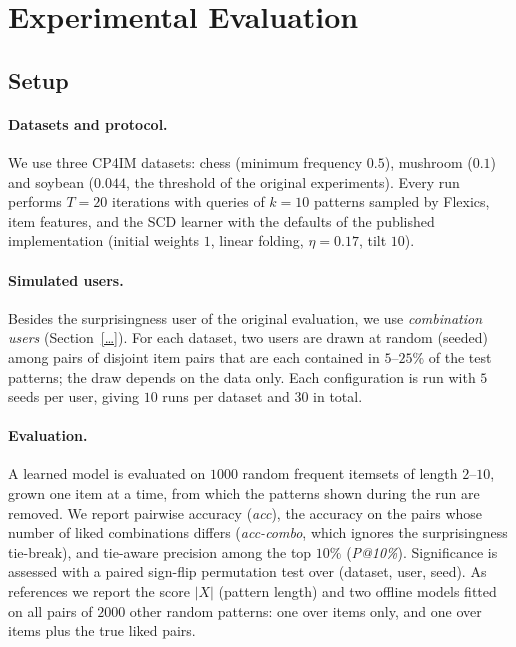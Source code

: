 
\section{Experimental Evaluation}
\label{sec:experiments}

\subsection{Setup}
\label{subsec:setup}

\paragraph{Datasets and protocol.}
We use three CP4IM datasets: chess (minimum frequency $0.5$), mushroom ($0.1$) and soybean ($0.044$, the
threshold of the original experiments). Every run performs $T = 20$ iterations with queries of $k = 10$
patterns sampled by Flexics, item features, and the SCD learner with the defaults of the published
implementation (initial weights $1$, linear folding, $\eta = 0.17$, tilt $10$).

\paragraph{Simulated users.}
Besides the surprisingness user of the original evaluation, we use \emph{combination users}
(Section~\ref{…}). For each dataset, two users are drawn at random (seeded) among pairs of disjoint item pairs
that are each contained in $5$--$25\%$ of the test patterns; the draw depends on the data only. Each
configuration is run with $5$ seeds per user, giving $10$ runs per dataset and $30$ in total.

\paragraph{Evaluation.}
A learned model is evaluated on $1000$ random frequent itemsets of length $2$--$10$, grown one item at a
time, from which the patterns shown during the run are removed. We report pairwise accuracy (\emph{acc}),
the accuracy on the pairs whose number of liked combinations differs (\emph{acc-combo}, which ignores the
surprisingness tie-break), and tie-aware precision among the top $10\%$ (\emph{P@10\%}). Significance is
assessed with a paired sign-flip permutation test over (dataset, user, seed). As references we report the
score $|X|$ (pattern length) and two offline models fitted on all pairs of $2000$ other random patterns: one
over items only, and one over items plus the true liked pairs.


